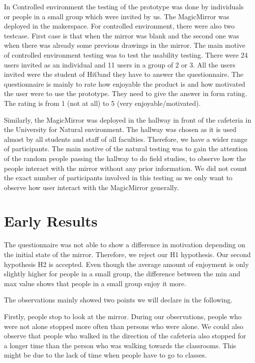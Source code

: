 \documentclass{sigchi-ext}
\begin{document}
In Controlled environment the testing of the prototype was done by individuals or people in a small group which were invited by us. The MagicMirror was deployed in the makerspace. For controlled environment, there were also two testcase. First case is that when the mirror was blank and the second one was when there was already some previous drawings in the mirror. The main motive of controlled environment testing was to test the usability testing. There were 24 users invited as an individual and 11 users in a group of 2 or 3. All the users invited were the student of Hi\O  and they have to answer the questionnaire. The questionnaire is mainly to rate how enjoyable the product is and how motivated the user were to use the prototype. They need to give the answer in form rating. The rating is from 1 (not at all) to 5 (very enjoyable/motivated).
 
Similarly, the MagicMirror was deployed in the hallway in front of the cafeteria in the University for Natural environment. The hallway was chosen as it is used almost by all students and staff of all faculties. Therefore, we have a wider range of participants. The main motive of the natural testing was to gain the attention of the random people passing the hallway to do field studies, to observe how the people interact with the mirror without any prior information. We did not count the exact number of participants involved in this testing as we only want to observe how user interact with the MagicMirror generally.

\section{Early Results}
The questionnaire was not able to show a difference in motivation depending on the initial state of the mirror. Therefore, we reject our H1 hypothesis. Our second hypothesis H2 is accepted. Even though the average amount of enjoyment is only slightly higher for people in a small group, the difference between the min and max value shows that people in a small group enjoy it more.

The observations mainly showed two points we will declare in the following. 

 Firstly, people stop to look at the mirror. During our observations, people who were not alone stopped more often than persons who were alone. We could also observe that people who walked in the direction of the cafeteria also stopped for a longer time than the person who was walking towards the classrooms. This might be due to the lack of time when people have to go to classes.
\end{document}
